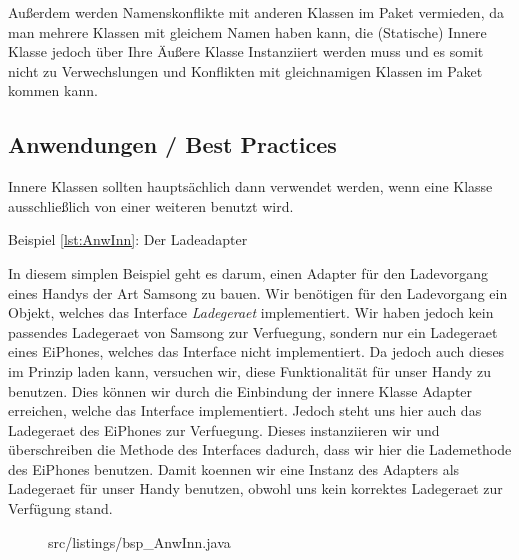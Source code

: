 Außerdem werden Namenskonflikte mit anderen Klassen im Paket vermieden, da man mehrere Klassen mit gleichem Namen haben kann, die (Statische) Innere Klasse jedoch über Ihre Äußere Klasse Instanziiert werden muss und es somit nicht zu Verwechslungen und Konflikten mit gleichnamigen Klassen im Paket kommen kann.

\subsection{Anwendungen / Best Practices}

Innere Klassen sollten hauptsächlich dann verwendet werden, wenn eine Klasse ausschließlich von einer weiteren benutzt wird.

Beispiel \ref{lst:AnwInn}: Der Ladeadapter

In diesem simplen Beispiel geht es darum, einen Adapter für den Ladevorgang eines Handys der Art Samsong zu bauen.
Wir benötigen für den Ladevorgang ein Objekt, welches das Interface {\it Ladegeraet} implementiert.
Wir haben jedoch kein passendes Ladegeraet von Samsong zur Verfuegung, sondern nur ein Ladegeraet eines EiPhones, welches das Interface nicht implementiert.
Da jedoch auch dieses im Prinzip laden kann, versuchen wir, diese Funktionalität für unser Handy zu benutzen.
Dies können wir durch die Einbindung der innere Klasse Adapter erreichen, welche das Interface implementiert.
Jedoch steht uns hier auch das Ladegeraet des EiPhones zur Verfuegung.
Dieses instanziieren wir und überschreiben die Methode des Interfaces dadurch, dass wir hier die Lademethode des EiPhones benutzen.
Damit koennen wir eine Instanz des Adapters als Ladegeraet für unser Handy benutzen, obwohl uns kein korrektes Ladegeraet zur Verfügung stand.

\newpage
\begin{figure}[hb]
\lstset{language=Java}
 {src/listings/bsp_AnwInn.java}
\end{figure}


\newpage
